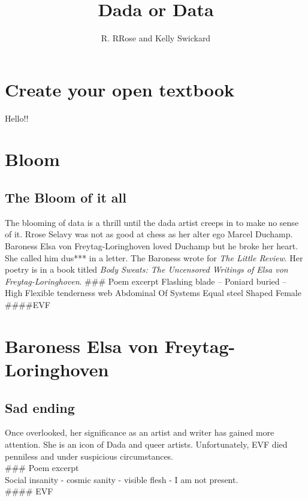 \documentclass[
  openany]{book}
\title{Dada or Data}
\author{R. RRose and Kelly Swickard}
\date{}
\begin{document}
\maketitle

{
\setcounter{tocdepth}{1}
\tableofcontents
}
\hypertarget{create-your-open-textbook}{%
\chapter{Create your open textbook}\label{create-your-open-textbook}}

Hello!!

\hypertarget{bloom}{%
\chapter{Bloom}\label{bloom}}

\hypertarget{the-bloom-of-it-all}{%
\section{The Bloom of it all}\label{the-bloom-of-it-all}}

The blooming of data is a thrill until the dada artist creeps in to make no sense of it. Rrose Selavy was not as good at chess as her alter ego Marcel Duchamp. Baroness Elsa von Freytag-Loringhoven loved Duchamp but he broke her heart. She called him dus*** in a letter. The Baroness wrote for \emph{The Little Review}. Her poetry is in a book titled \emph{Body Sweats: The Uncensored Writings of Elsa von Freytag-Loringhoven}.
\#\#\# Poem excerpt
Flashing blade --
Poniard buried --
High
Flexible tenderness web
Abdominal
Of
Systems
Equal steel
Shaped
Female
\#\#\#\#EVF

\hypertarget{baroness-elsa-von-freytag-loringhoven}{%
\chapter{Baroness Elsa von Freytag-Loringhoven}\label{baroness-elsa-von-freytag-loringhoven}}

\hypertarget{sad-ending}{%
\section{Sad ending}\label{sad-ending}}

Once overlooked, her significance as an artist and writer has gained more attention. She is an icon of Dada and queer artists. Unfortunately, EVF died penniless and under suspicious circumstances.\\
\#\#\# Poem excerpt\\
Social insanity - cosmic sanity - visible flesh - I am not present.\\
\#\#\#\# EVF
\end{document}
